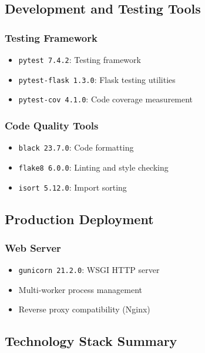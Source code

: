 \documentclass[12pt,a4paper]{article}
\begin{document}
\subsection{Development and Testing Tools}

\subsubsection{Testing Framework}

\begin{itemize}[leftmargin=*]
    \item \texttt{pytest 7.4.2}: Testing framework
    \item \texttt{pytest-flask 1.3.0}: Flask testing utilities
    \item \texttt{pytest-cov 4.1.0}: Code coverage measurement
\end{itemize}

\subsubsection{Code Quality Tools}

\begin{itemize}[leftmargin=*]
    \item \texttt{black 23.7.0}: Code formatting
    \item \texttt{flake8 6.0.0}: Linting and style checking
    \item \texttt{isort 5.12.0}: Import sorting
\end{itemize}

\subsection{Production Deployment}

\subsubsection{Web Server}

\begin{itemize}[leftmargin=*]
    \item \texttt{gunicorn 21.2.0}: WSGI HTTP server
    \item Multi-worker process management
    \item Reverse proxy compatibility (Nginx)
\end{itemize}

\subsection{Technology Stack Summary}
\end{document}
